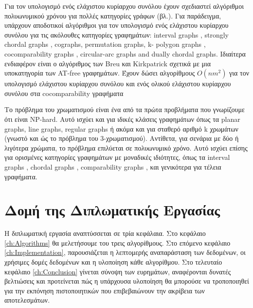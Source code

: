 Για τον υπολογισμό ενός ελάχιστου κυρίαρχου συνόλου έχουν σχεδιαστεί αλγόριθμοι πολυωνυμικού χρόνου για πολλές κατηγορίες γράφων (βλ.\cite{arnborg-combinatorial-algorithms,johnson-np-completeness-column}). Για παράδειγμα, υπάρχουν αποδοτικοί αλγόριθμοι για τον υπολογισμό ενός  ελάχιστου κυρίαρχου συνόλου για τις
ακόλουθες κατηγορίες γραφημάτων: interval graphs \cite{chang-domination-interval-circular-arc},
strongly chordal graphs\cite{chang-labelling-sunfree-chordal,farber-strongly-chordal-duality} , cographs\cite{corneil-perl-clustering-domination}, permutation graphs\cite{corneil-stewart-dominating-perfect-graphs,farber-keil-domination-permutation,rhee-liang-dhall-lakshmivarahan-permutation-graph-algorithm,rhee-liang-dhall-lakshmivarahan-permutation-graph-algorithm}, k-
polygon graphs \cite{elmallah-stewart-polygon-graphs}, cocomparability graphs \cite{breu-kirkpatrick-cocomparability-graphs,kratsch-stewart-cocomparability-domination}, circular-arc graphs \cite{chang-domination-interval-circular-arc-1998} and dually chordal graphs\cite{brandstadt-chepoi-dragan-hypertree-1998}. Ιδιαίτερα ενδιαφέρον είναι ο αλγόριθμος των Breu και Kirkpatrick σχετικά με μια υποκατηγορία των AT-free γραφημάτων. Έχουν δώσει αλγορίθμους $O(nm^2)$ για τον υπολογισμό   ελάχιστου κυρίαρχου συνόλου και ενός ολικού ελάχιστου κυρίαρχου συνόλου στα cocomparability γραφήματα\cite{breu-kirkpatrick-cocomparability-graphs}


Το πρόβλημα του χρωματισμού είναι ένα από τα πρώτα προβλήματα που γνωρίζουμε ότι είναι NP-hard\cite{garey-johnson-np-completeness}. Αυτό ισχύει και για ιδικές κλάσεις γραφημάτων όπως τα planar graphs\cite{garey-johnson-stockmeyer-simplified-np}, line graphs\cite{holyer-np-completeness-edge-coloring}, regular graphs\cite{dailey-uniqueness-colorability-np-complete} ή ακόμα και για σταθερό αριθμό k χρωμάτων (γνωστό και ώς το πρόβλημα του 3-χρωματισμού)\cite{garey-johnson-stockmeyer-simplified-np}. Αντίθετα, για σενάρια με δύο ή λιγότερα χρώματα, το πρόβλημα επιλύεται σε πολυωνυμικό χρόνο. Αυτό ισχύει επίσης για ορισμένες κατηγορίες γραφημάτων με μοναδικές ιδιότητες, όπως τα interval graphs
\cite{golumbic-algorithmic-graph-theory-perfect-graphs}, chordal graphs \cite{golumbic-algorithmic-graph-theory-perfect-graphs}, comparability graphs \cite{golumbic-algorithmic-graph-theory-perfect-graphs}, και γενικότερα για τέλεια
γραφήματα\cite{grotschel-lovasz-schrijver-ellipsoid-method}. 



\section{Δομή της Διπλωματικής Εργασίας}
\label{sec:Structure}
Η διπλωματική εργασία αναπτύσσεται σε τρία κεφάλαια. Στο κεφάλαιο \ref{ch:Algorithms} θα μελετήσουμε του τρεις αλγορίθμους. Στο επόμενο κεφάλαιο \ref{ch:Implementation}, παρουσιάζεται η λεπτομερής αναπαράσταση των δεδομένων, οι χρήσιμες δομές δεδομένων και η υλοποίηση κάθε αλγορίθμου. Στο τελευταίο κεφάλαιο \ref{ch:Conclusion} γίνεται σύνοψη των ευρημάτων, αναφέρονται δυνατές βελτιώσεις και προτείνεται πώς η υπάρχουσα υλοποίηση θα μπορούσε να τροποποιηθεί για την εκπόνηση πιστοποιητικών που επιβεβαιώνουν την ακρίβεια των αποτελεσμάτων.